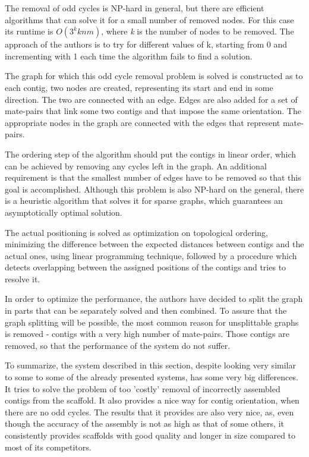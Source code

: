 \documentclass[11pt]{article}
\begin{document}
The removal of odd cycles is NP-hard in general, but there are efficient
algorithms that can solve it for a small number of removed nodes. For this case
its runtime is $O(3^k k n m )$, where \emph{k} is the number of nodes to be
removed. The approach of the authors is to try for different values of k,
starting from 0 and incrementing with 1 each time the algorithm fails to find a
solution.

The graph for which this odd cycle removal problem is solved is constructed as
to each contig, two nodes are created, representing its start and end in some
direction. The two are connected with an edge. Edges are also added for a set of
mate-pairs that link some two contigs and that impose the same orientation. The
appropriate nodes in the graph are connected with the edges that represent
mate-pairs.

The ordering step of the algorithm should put the contigs in linear order, which
can be achieved by removing any cycles left in the graph. An additional
requirement is that the smallest number of edges have to be removed so that this
goal is accomplished. Although this problem is also NP-hard on the general,
there is a heuristic algorithm that solves it for sparse graphs, which
guarantees an asymptotically optimal solution.

The actual positioning is solved as optimization on topological ordering,
minimizing the difference between the expected distances between contigs and the
actual ones, using linear programming technique, followed by a procedure which
detects overlapping between the assigned positions of the contigs and tries to
resolve it.

In order to optimize the performance, the authors have decided to split the
graph in parts that can be separately solved and then combined. To assure that
the graph splitting will be possible, the most common reason for unsplittable
graphs is removed - contigs with a very high number of mate-pairs. Those contigs
are removed, so that the performance of the system do not suffer.

To summarize, the system described in this section, despite looking very similar
to some to some of the already presented systems, has some very big differences.
It tries to solve the problem of too 'costly' removal of incorrectly assembled
contigs from the scaffold. It also provides a nice way for contig orientation,
when there are no odd cycles. The results that it provides are also very nice,
as, even though the accuracy of the assembly is not as high as that of some
others, it consistently provides scaffolds with good quality and longer in size
compared to most of its competitors.
\end{document}
